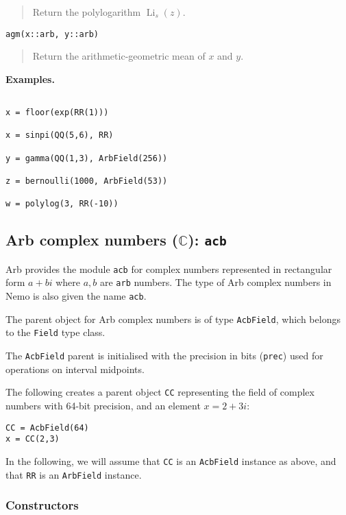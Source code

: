 \documentclass[a4paper,10pt]{article}
\newcommand{\C}{\mathbb{C}}
\newcommand{\code}{\lstinline}
\newcommand{\desc}[1]{\vspace{-3mm}\begin{quote}#1\end{quote}}
\begin{document}
{{\desc{Return the polylogarithm $\operatorname{Li}_s(z)$.}

\begin{lstlisting}
agm(x::arb, y::arb)
\end{lstlisting}

\desc{Return the arithmetic-geometric mean of $x$ and $y$.}

\textbf{Examples.}

\begin{lstlisting}

x = floor(exp(RR(1)))

x = sinpi(QQ(5,6), RR)

y = gamma(QQ(1,3), ArbField(256))

z = bernoulli(1000, ArbField(53))

w = polylog(3, RR(-10))

\end{lstlisting}

\subsection{Arb complex numbers ($\C$): \code|acb|}

Arb provides the module \code{acb} for complex numbers represented
in rectangular form $a+bi$ where $a,b$ are \code{arb} numbers.
The type of Arb complex numbers in Nemo is also given the name \code{acb}.

The parent object for Arb complex numbers is of type \code{AcbField}, which
belongs to the \code{Field} type class.

The \code{AcbField} parent is initialised with the precision in bits (\code{prec})
used for operations on interval midpoints.

The following creates a parent object \code{CC} representing
the field of complex numbers with 64-bit precision, and an
element $x = 2+3i$:

\begin{lstlisting}
CC = AcbField(64)
x = CC(2,3)
\end{lstlisting}

In the following, we will assume that \code{CC} is an \code{AcbField}
instance as above, and that \code{RR} is an \code{ArbField} instance.



\subsubsection{Constructors}

}}
\end{document}
